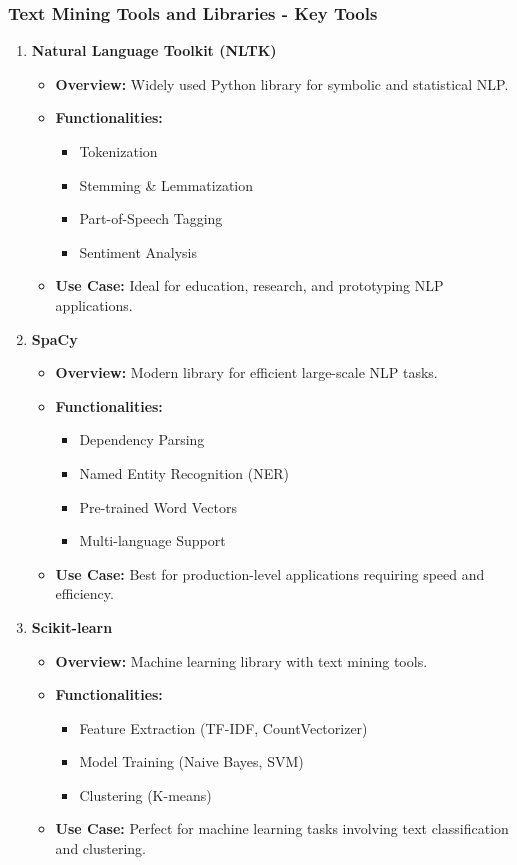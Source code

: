 \documentclass[aspectratio=169]{beamer}
\begin{document}
\begin{frame}[fragile]
  \frametitle{Text Mining Tools and Libraries - Key Tools}
  \begin{enumerate}
    \item \textbf{Natural Language Toolkit (NLTK)}
      \begin{itemize}
        \item \textbf{Overview:} Widely used Python library for symbolic and statistical NLP.
        \item \textbf{Functionalities:}
          \begin{itemize}
            \item Tokenization
            \item Stemming \& Lemmatization
            \item Part-of-Speech Tagging
            \item Sentiment Analysis
          \end{itemize}
        \item \textbf{Use Case:} Ideal for education, research, and prototyping NLP applications.
      \end{itemize}
    \item \textbf{SpaCy}
      \begin{itemize}
        \item \textbf{Overview:} Modern library for efficient large-scale NLP tasks.
        \item \textbf{Functionalities:}
          \begin{itemize}
            \item Dependency Parsing
            \item Named Entity Recognition (NER)
            \item Pre-trained Word Vectors
            \item Multi-language Support
          \end{itemize}
        \item \textbf{Use Case:} Best for production-level applications requiring speed and efficiency.
      \end{itemize}
    \item \textbf{Scikit-learn}
      \begin{itemize}
        \item \textbf{Overview:} Machine learning library with text mining tools.
        \item \textbf{Functionalities:}
          \begin{itemize}
            \item Feature Extraction (TF-IDF, CountVectorizer)
            \item Model Training (Naive Bayes, SVM)
            \item Clustering (K-means)
          \end{itemize}
        \item \textbf{Use Case:} Perfect for machine learning tasks involving text classification and clustering.
      \end{itemize}
  \end{enumerate}
\end{frame}
\end{document}
